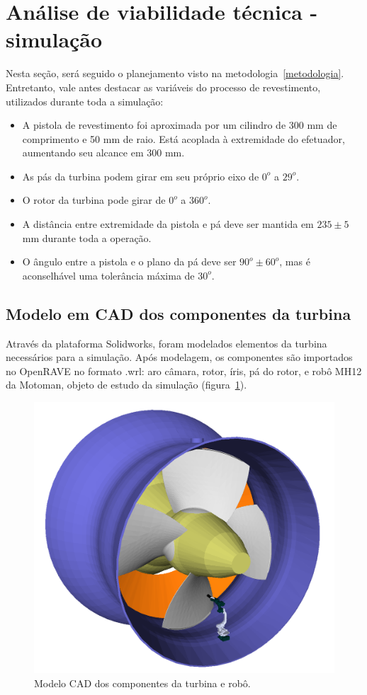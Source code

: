 \section{Análise de viabilidade técnica - simulação}

Nesta seção, será seguido o planejamento visto na metodologia~\ref{metodologia}.
Entretanto, vale antes destacar as variáveis do processo de revestimento,
utilizados durante toda a simulação:

\begin{itemize}
  \item A pistola de revestimento foi aproximada por um cilindro de 300 mm de
  comprimento e 50 mm de raio. Está acoplada à extremidade do efetuador,
  aumentando seu alcance em 300 mm.
  \item As pás da turbina podem girar em seu próprio eixo de $0^o$ a $29^o$.
  \item O rotor da turbina pode girar de $0^o$ a $360^o$.
  \item A distância entre extremidade da pistola e pá deve ser mantida em $235
  \pm 5$ mm durante toda a operação.
  \item O ângulo entre a pistola e o plano da pá deve ser $90^o \pm 60^o$, mas
  é aconselhável uma tolerância máxima de $30^o$.
\end{itemize}

\subsection{Modelo em CAD dos componentes da turbina}

Através da plataforma Solidworks, foram modelados elementos da turbina
necessários para a simulação. Após modelagem, os componentes são importados no
OpenRAVE no formato .wrl: aro câmara, rotor, íris, pá do rotor, e robô MH12 da
Motoman, objeto de estudo da simulação (figura~\ref{fig::arocamara}).

\begin{figure}[!ht]
	\centering	
	\includegraphics[width=.5\columnwidth]{figs/arocamara.png}
	\caption{Modelo CAD dos componentes da turbina e robô.}
	\label{fig::arocamara}
\end{figure}

